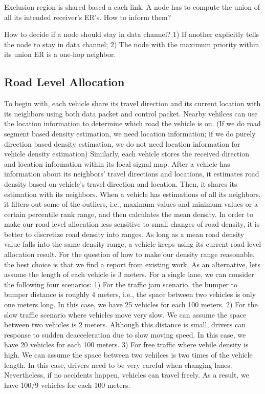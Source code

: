 \documentclass[10pt]{article}
\begin{document}
Exclusion region is shared based a each link. A node has to compute the union of all its intended receiver's ER's. How to inform them?

How to decide if a node should stay in data channel? 1) If another explicitly tells the node to stay in data channel; 2) The node with the maximum priority within its union ER is a one-hop neighbor.


\subsection{Road Level Allocation}
To begin with, each vehicle share its travel direction and its current location with its neighbors using both data packet and control packet. Nearby vehilces can use the location information to determine which road the vehicle is on. (If we do road segment based density estimation, we need location information; if we do purely direction based density estimation, we do not need location information for vehicle density estimation)
Similarly, each vehicle stores the received direction and location information within its local signal map.
After a vehicle has information about its neighbors' travel directions and locations, it estimates road density based on vehicle's travel direction and location. Then, it shares its estimation with its neighbors. When a vehicle has estimations of all its neighbors, it filters out some of the outliers, i.e., maximum values and minimum values or a certain percentile rank range, and then calculates the mean density. In order to make our road level allocation less sensitive to small changes of road density, it is better to discretize road density into ranges.
As long as a mean road density value falls into the same density range, a vehicle keeps using its current road level allocation result.
For the question of how to make our density range reasonable, the best choice is that we find a report from existing work.
As an alternative, lets assume the length of each vehicle is 3 meters.
For a single lane, we can consider the following four scenarios: 
  1) For the traffic jam scenario, the bumper to bumper distance is roughly 4 meters, i.e., the space between two vehicles is only one meters long. In this case, we have 25 vehicles for each 100 meters. 
  2) For the slow traffic scenario where vehicles move very slow. We can assume the space between two vehicles is 2 meters. Although this distance is small, drivers can response to sudden deacceleration due to slow moving speed. In this case, we have 20 vehicles for each 100 meters.   3) For free traffic where vehile density is high. We can assume the space between two vehilces is two times of the vehicle length. In this case, drivers need to be very careful when changing lanes. Nevertheless, if no accidents happen, vehicles can travel freely. As a result, we have 100/9 vehicles for each 100 meters.
\end{document}

